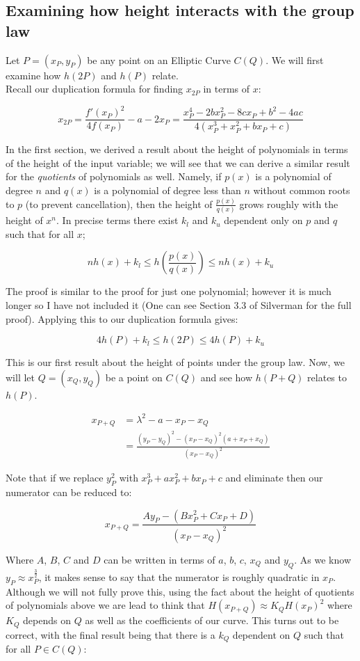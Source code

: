 \documentclass{article}
\begin{document}
\subsection{Examining how height interacts with the group law}

Let $P = (x_P, y_P)$ be any point on an Elliptic Curve $C(Q)$. We will first examine how $h(2P)$ and $h(P)$ relate.\\

Recall our duplication formula for finding $x_{2P}$ in terms of $x$:

\[x_{2P} = \frac{f'(x_P)^2}{4 f(x_P)} - a - 2x_P = \frac{x_P^4 - 2bx_P^2 - 8cx_P + b^2 - 4ac}{4(x_P^3 +x_P^2 + bx_P + c)}\]

In the first section, we derived a result about the height of polynomials in terms of the height of the input variable; we will see that we can derive a similar result for the \emph{quotients} of polynomials as well. Namely, if $p(x)$ is a polynomial of degree $n$ and $q(x)$ is a polynomial of degree less than $n$ without common roots to $p$ (to prevent cancellation), then the height of $\frac{p(x)}{q(x)}$ grows roughly with the height of $x^n$. In precise terms there exist $k_l$ and $k_u$ dependent only on $p$ and $q$ such that for all $x$;

\[n h(x) + k_l \leq h \left( \frac{p(x)}{q(x)} \right) \leq n h(x) + k_u \]

The proof is similar to the proof for just one polynomial; however it is much longer so I have not included it (One can see Section 3.3 of Silverman for the full proof). Applying this to our duplication formula gives:

\[4h(P) + k_l \leq h(2P) \leq 4 h(P) + k_u\]

This is our first result about the height of points under the group law. Now, we will let $Q = (x_Q, y_Q)$ be a point on $C(Q)$ and see how $h(P + Q)$ relates to $h(P)$.

\begin{align*}
    x_{P + Q} &= \lambda^2 - a - x_P - x_Q\\
              &= \frac{(y_P - y_Q)^2 - (x_P - x_Q)^2(a + x_P + x_Q)}{(x_P - x_Q)^2}
\end{align*}

Note that if we replace $y_P^2$ with $x_P^3 + a x_P ^2 + b x_P + c$ and eliminate then our numerator can be reduced to:

\[x_{P + Q} = \frac{A y_P - (B x_P^2 + C x_P + D)}{(x_P - x_Q)^2}\]

Where $A$, $B$, $C$ and $D$ can be written in terms of $a$, $b$, $c$, $x_Q$ and $y_Q$. As we know $y_P \approx x_P^{\frac{3}{2}}$, it makes sense to say that the numerator is roughly quadratic in $x_P$. Although we will not fully prove this, using the fact about the height of quotients of polynomials above we are lead to think that $H(x_{P+Q}) \approx K_Q H(x_P)^2$ where $K_Q$ depends on $Q$ as well as the coefficients of our curve. This turns out to be correct, with the final result being that there is a $k_Q$ dependent on $Q$ such that for all $P \in C(Q)$:
\end{document}
